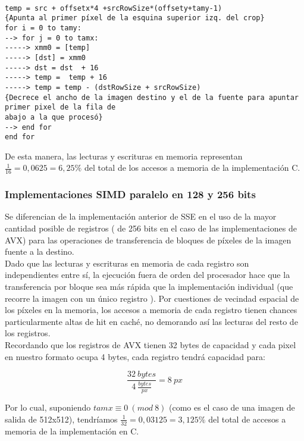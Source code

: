 \begin{codesnippet}
\begin{verbatim}

temp = src + offsetx*4 +srcRowSize*(offsety+tamy-1)       
{Apunta al primer píxel de la esquina superior izq. del crop}
for i = 0 to tamy:  
--> for j = 0 to tamx:  
-----> xmm0 = [temp]
-----> [dst] = xmm0 
-----> dst = dst  + 16 
-----> temp =  temp + 16 
-----> temp = temp - (dstRowSize + srcRowSize)       
{Decrece el ancho de la imagen destino y el de la fuente para apuntar primer pixel de la fila de
abajo a la que procesó}    
--> end for 
end for 

\end{verbatim}
\end{codesnippet}



De esta manera, las lecturas y escrituras en memoria representan $\frac{1}{16} = 0,0625 =  6,25\%$ del total de los accesos a memoria de la implementación C.


\subsubsection{Implementaciones SIMD paralelo en 128 y 256 bits}
Se diferencian de la implementación anterior de SSE en el uso de la mayor cantidad posible de registros \xmm{} (\ymm{} de 256 bits en el caso de las implementaciones de AVX) para las operaciones de transferencia de bloques de píxeles de la imagen fuente a la destino. 
\\

Dado que las lecturas y escrituras en memoria de cada registro son independientes entre sí, la ejecución fuera de orden del procesador hace que la transferencia por bloque sea más rápida que la implementación individual (que recorre la imagen con un único registro \xmm{}). Por cuestiones de vecindad espacial de los píxeles en la memoria, los accesos a memoria de cada registro tienen chances particularmente altas de hit en caché, no demorando así las lecturas del resto de los registros.
\\

Recordando que los registros de AVX tienen 32 bytes de capacidad y cada pixel en nuestro formato ocupa 4 bytes, cada registro \ymm{} tendrá capacidad para:

$$ \frac{32 \ bytes}{4 \ \frac{bytes}{px}} = 8 \ px $$

Por lo cual, suponiendo $ tamx \equiv 0 \ (mod \ 8) $ (como es el caso de una imagen de salida de 512x512), tendríamos $\frac{1}{32} = 0,03125 =  3,125\%$ del total de accesos a memoria de la implementación en C.

